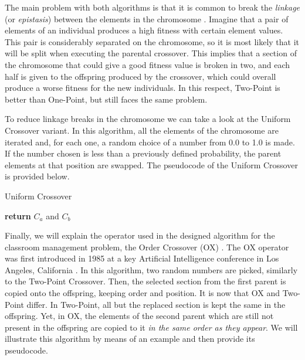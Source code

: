 The main problem with both algorithms is that it is common to break the \textit{linkage} (or \textit{epistasis}) between the elements in the chromosome \cite{luke13metaheuristics}. Imagine that a pair of elements of an individual produces a high fitness with certain element values. This pair is considerably separated on the chromosome, so it is most likely that it will be split when executing the parental crossover. This implies that a section of the chromosome that could give a good fitness value is broken in two, and each half is given to the offspring produced by the crossover, which could overall produce a worse fitness for the new individuals. In this respect, Two-Point is better than One-Point, but still faces the same problem. 

To reduce linkage breaks in the chromosome we can take a look at the Uniform Crossover variant. In this algorithm, all the elements of the chromosome are iterated and, for each one, a random choice of a number from 0.0 to 1.0 is made. If the number chosen is less than a previously defined probability, the parent elements at that position are swapped. The pseudocode of the Uniform Crossover is provided below.

\begin{algorithm}[H]
    \caption{Uniform Crossover}
    \begin{algorithmic}[1]
                \EndIf
            \EndFor
            \State \textbf{return} {$C_{a}$ and $C_{b}$}
        \EndProcedure
    \end{algorithmic}
\end{algorithm}

Finally, we will explain the operator used in the designed algorithm for the classroom management problem, the Order Crossover (OX) \cite{davis85ox}. The OX operator was first introduced in 1985 at a key Artificial Intelligence conference in Los Angeles, California \cite{joshi85ai}. In this algorithm, two random numbers are picked, similarly to the Two-Point Crossover. Then, the selected section from the first parent is copied onto the offspring, keeping order and position. It is now that OX and Two-Point differ. In Two-Point, all but the replaced section is kept the same in the offspring. Yet, in OX, the elements of the second parent which are still not present in the offspring are copied to it \textit{in the same order as they appear}. We will illustrate this algorithm by means of an example and then provide its pseudocode. 


